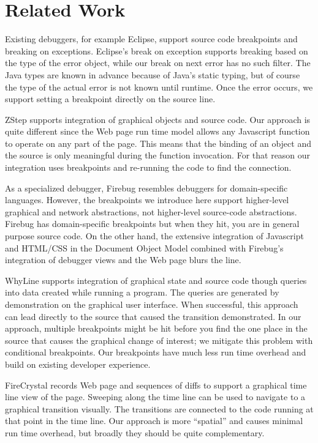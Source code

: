 \documentclass{www2010-accepted}
\begin{document}
\section{Related Work}

Existing debuggers, for example Eclipse, support source code
breakpoints and breaking on exceptions.  Eclipse's break on exception
supports breaking based on the type of the error object, while our
break on next error has no such filter. The Java types are known in
advance because of Java's static typing, but of course the type of the
actual error is not known until runtime.  Once the error occurs, we
support setting a breakpoint directly on the source line.

ZStep\cite{Lieberman95bridgingthe} supports integration of graphical
objects and source code. Our approach is quite different since the Web
page run time model allows any Javascript function to operate on any
part of the page. This means that the binding of an object and the
source is only meaningful during the function invocation. For that
reason our integration uses breakpoints and re-running the code to
find the connection.

As a specialized debugger, Firebug resembles debuggers for
domain-specific languages\cite{Wu04DomainEclipse}. However, the
breakpoints we introduce here support higher-level graphical and
network abstractions, not higher-level source-code
abstractions. Firebug has domain-specific breakpoints but when they
hit, you are in general purpose source code.  On the other hand, the
extensive integration of Javascript and HTML/CSS in the Document
Object Model combined with Firebug's integration of debugger views and
the Web page blurs the line. 

WhyLine\cite{Ko2008WhyLine} supports integration of graphical state and source code
though queries into data created while running a program. The queries
are generated by demonstration on the graphical user interface. When
successful, this approach can lead directly to the source that caused
the transition demonstrated. In our approach, multiple breakpoints
might be hit before you find the one place in the source that
causes the graphical change of interest; we mitigate this problem with
conditional breakpoints. Our breakpoints have much less run time
overhead and build on existing developer experience.

FireCrystal\cite{Oney2009Firecrystal} records Web page and sequences
of diffs to support a graphical time line view of the page. Sweeping
along the time line can be used to navigate to a graphical transition
visually. The transitions are connected to the code running at that
point in the time line. Our approach is more ``spatial'' and causes
minimal run time overhead, but broadly they should be quite
complementary.
\end{document}
